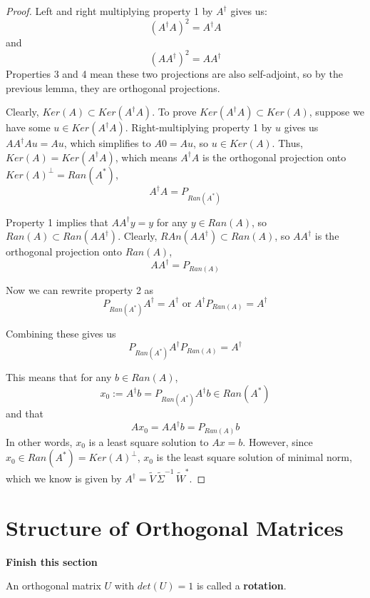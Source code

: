 \begin{proof}
Left and right multiplying property 1 by $A^{\dagger}$ gives us: 
$$(A^{\dagger} A)^{2} = A^{\dagger} A$$ 
and
$$ (AA^{\dagger})^{2} = AA^{\dagger}$$
Properties 3 and 4 mean these two projections are also self-adjoint, so by the previous lemma, they are orthogonal projections. 

Clearly, $Ker(A) \subset Ker(A^{\dagger}A)$. To prove $Ker(A^{\dagger} A) \subset Ker(A)$, suppose we have some $u \in Ker(A^{\dagger} A)$. Right-multiplying property 1 by $u$ gives us $AA^{\dagger}Au = Au$, which simplifies to $A0 = Au$, so $u \in Ker(A)$. Thus, $Ker(A) = Ker(A^{\dagger}A)$, which means $A^{\dagger}A$ is the orthogonal projection onto $Ker(A)^{\perp} = Ran(A^{*})$, 
$$A^{\dagger}A = P_{Ran(A^{*})}$$

Property 1 implies that $AA^{\dagger} y = y$ for any $y \in Ran(A)$, so $Ran(A) \subset Ran(AA^{\dagger})$. Clearly, $RAn(AA^{\dagger}) \subset Ran(A)$, so $AA^{\dagger}$ is the orthogonal projection onto $Ran(A)$, 
$$AA^{\dagger} = P_{Ran(A)}$$

Now we can rewrite property 2 as 
$$P_{Ran(A^{*})} A^{\dagger} = A^{\dagger} \text{ or } A^{\dagger} P_{Ran(A)} = A^{\dagger}$$

Combining these gives us 
$$P_{Ran(A^{*})} A^{\dagger} P_{Ran(A)} = A^{\dagger}$$

This means that for any $b \in Ran(A)$, 
$$x_{0} := A^{\dagger} b = P_{Ran(A^{*})} A^{\dagger} b \in Ran(A^{*})$$
and that 
$$Ax_{0} = AA^{\dagger} b = P_{Ran(A)} b$$
In other words, $x_{0}$ is a least square solution to $Ax = b$. However, since $x_{0} \in Ran(A^{*}) = Ker(A)^{\perp}$, $x_{0}$ is the least square solution of minimal norm, which we know is given by $A^{\dagger} = \widetilde{V} \, \widetilde{\Sigma}^{-1} \, \widetilde{W}^{*}$.
\end{proof}

\section{Structure of Orthogonal Matrices}
\textbf{Finish this section}

An orthogonal matrix $U$ with $det(U) = 1$ is called a \textbf{rotation}. 

